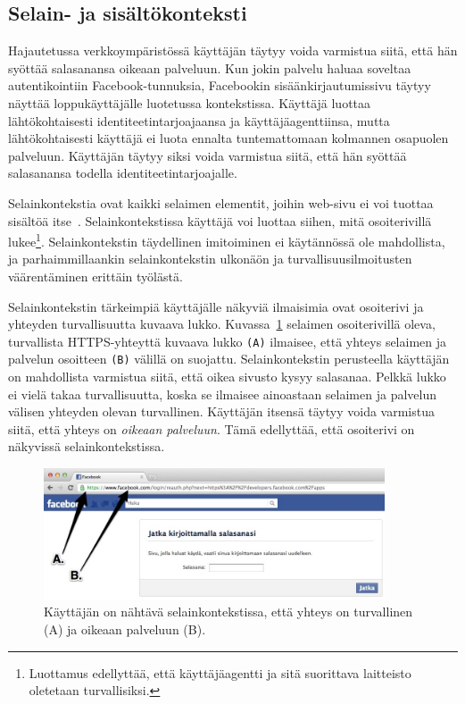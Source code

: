 \documentclass[finnish,gradu]{tktltiki}
\begin{document}



  \subsection{Selain- ja sisältökonteksti} %
  \label{sub:selainkonteksti_vs_applikaatiokonteksti}

  Hajautetussa verkkoympäristössä käyttäjän täytyy voida varmistua siitä, että hän syöttää salasanansa oikeaan palveluun. Kun jokin palvelu haluaa soveltaa autentikointiin Facebook-tunnuksia, Facebookin sisäänkirjautumissivu täytyy näyttää loppukäyttäjälle luotetussa kontekstissa. Käyttäjä luottaa lähtökohtaisesti identiteetintarjoajaansa ja käyttäjäagenttiinsa, mutta lähtökohtaisesti käyttäjä ei luota ennalta tuntemattomaan kolmannen osapuolen palveluun. Käyttäjän täytyy siksi voida varmistua siitä, että hän syöttää salasanansa todella identiteetintarjoajalle.

  Selainkontekstia ovat kaikki selaimen elementit, joihin web-sivu ei voi tuottaa sisältöä itse~\cite{why_phishing_works_06}. Selainkontekstissa käyttäjä voi luottaa siihen, mitä osoiterivillä lukee\footnote{Luottamus edellyttää, että käyttäjäagentti ja sitä suorittava laitteisto oletetaan turvallisiksi.}. Selainkontekstin täydellinen imitoiminen ei käytännössä ole mahdollista, ja parhaimmillaankin selainkontekstin ulkonäön ja turvallisuusilmoitusten väärentäminen erittäin työlästä.

  Selainkontekstin tärkeimpiä käyttäjälle näkyviä ilmaisimia ovat osoiterivi ja yhteyden turvallisuutta kuvaava lukko. Kuvassa~\ref{fig:facebook_reauth_ab} selaimen osoiterivillä oleva, turvallista HTTPS-yhteyttä kuvaava lukko \verb!(A)! ilmaisee, että yhteys selaimen ja palvelun osoitteen \verb!(B)! välillä on suojattu. Selainkontekstin perusteella käyttäjän on mahdollista varmistua siitä, että oikea sivusto kysyy salasanaa. Pelkkä lukko ei vielä takaa turvallisuutta, koska se ilmaisee ainoastaan selaimen ja palvelun välisen yhteyden olevan turvallinen. Käyttäjän itsensä täytyy voida varmistua siitä, että yhteys on \emph{oikeaan palveluun}. Tämä edellyttää, että osoiterivi on näkyvissä selainkontekstissa.

  \begin{figure}
    \centering
    \includegraphics[width=0.9\textwidth]{images/Facebook_reauth_ab.jpg}
    \caption{Käyttäjän on nähtävä selainkontekstissa, että yhteys on turvallinen (A) ja oikeaan palveluun (B).}
    \label{fig:facebook_reauth_ab}
  \end{figure}
\end{document}
